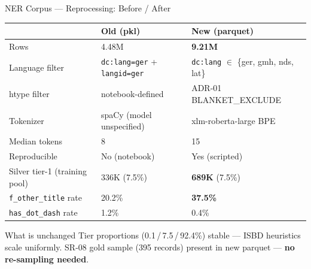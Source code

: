 \documentclass[xcolor,aspectratio=169,compress]{beamer}
\begin{document}
\begin{frame}{NER Corpus --- Reprocessing: Before / After}
  \small
  \begin{center}
  \footnotesize
  \begin{tabular}{lll}
    \toprule
    & \textbf{Old (pkl)} & \textbf{New (parquet)} \\
    \midrule
    Rows          & 4.48M                          & \textbf{9.21M} \\
    Language filter & \texttt{dc:lang=ger} + \texttt{langid=ger} & \texttt{dc:lang} $\in$ \{ger, gmh, nds, lat\} \\
    htype filter  & notebook-defined               & ADR-01 BLANKET\_EXCLUDE \\
    Tokenizer     & spaCy (model unspecified)      & xlm-roberta-large BPE \\
    Median tokens & 8                              & 15 \\
    Reproducible  & No (notebook)                  & Yes (scripted) \\
    \midrule
    Silver tier-1 (training pool) & 336K (7.5\%)  & \textbf{689K} (7.5\%) \\
    \texttt{f\_other\_title} rate & 20.2\%         & \textbf{37.5\%} \\
    \texttt{has\_dot\_dash} rate  & 1.2\%          & 0.4\% \\
    \bottomrule
  \end{tabular}
  \end{center}
  \smallskip
  \begin{block}{What is unchanged}
    \footnotesize
    Tier proportions (0.1\,/\,7.5\,/\,92.4\%) stable --- ISBD heuristics scale uniformly. \quad
    SR-08 gold sample (395 records) present in new parquet --- \textbf{no re-sampling needed}.
  \end{block}
\end{frame}
\end{document}
